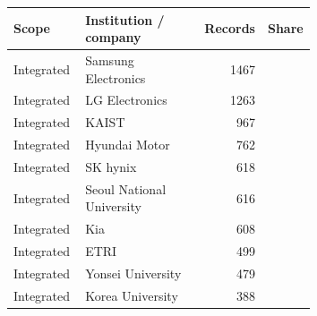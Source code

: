 \begin{tabular}{p{0.24\linewidth}p{0.43\linewidth}rr}
\toprule
Scope & Institution / company & Records & Share \\
\midrule
Integrated & Samsung Electronics & 1467 &  \\
Integrated & LG Electronics & 1263 &  \\
Integrated & KAIST & 967 &  \\
Integrated & Hyundai Motor & 762 &  \\
Integrated & SK hynix & 618 &  \\
Integrated & Seoul National University & 616 &  \\
Integrated & Kia & 608 &  \\
Integrated & ETRI & 499 &  \\
Integrated & Yonsei University & 479 &  \\
Integrated & Korea University & 388 &  \\
\bottomrule
\end{tabular}
